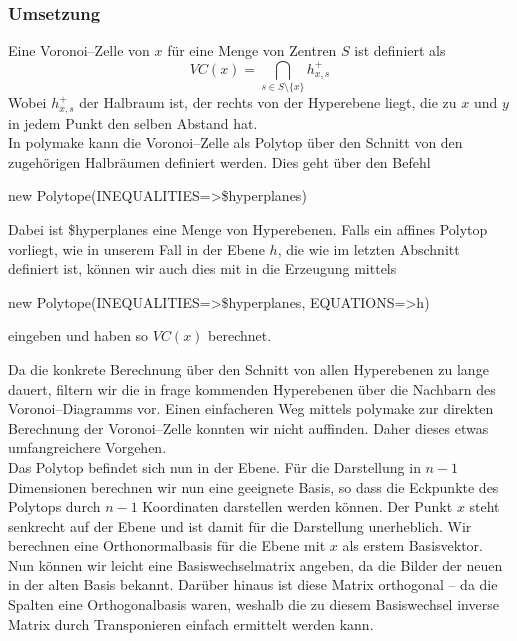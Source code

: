         \subsubsection*{Umsetzung}
         Eine Voronoi--Zelle von $x$ für eine Menge von Zentren $S$ ist definiert als 
         $$ VC(x) = \bigcap_{s \in S \setminus \{ x \}} h^+_{x,s}$$
         Wobei $h^+_{x,s}$ der Halbraum ist, der rechts von der Hyperebene liegt, die zu $x$ und $y$ in jedem Punkt den selben Abstand hat.\\
         
         In polymake kann die Voronoi--Zelle als Polytop über den Schnitt von den zugehörigen Halbräumen definiert werden. Dies geht über den Befehl

         \begin{code}
            new Polytope(INEQUALITIES=>\$hyperplanes)
         \end{code}

         Dabei ist \$hyperplanes eine Menge von Hyperebenen. Falls ein affines Polytop vorliegt, wie in unserem Fall in der Ebene $h$, die wie im letzten Abschnitt
         definiert ist, können wir auch dies mit in die Erzeugung mittels

         \begin{code}
            new Polytope(INEQUALITIES=>\$hyperplanes, EQUATIONS=>{h})
         \end{code}

         eingeben und haben so $VC(x)$ berechnet. 
         
         Da die konkrete Berechnung über den Schnitt von allen Hyperebenen zu lange dauert, filtern wir die in frage kommenden Hyperebenen über die Nachbarn des Voronoi--Diagramms vor.
         Einen einfacheren Weg mittels polymake zur direkten Berechnung der Voronoi--Zelle konnten wir nicht auffinden. Daher dieses etwas umfangreichere Vorgehen.\\

         Das Polytop befindet sich nun in der Ebene. Für die Darstellung in $n-1$ Dimensionen berechnen wir nun eine geeignete Basis, so dass die Eckpunkte des Polytops durch $n-1$ Koordinaten darstellen werden können. 
         Der Punkt $x$ steht senkrecht auf der Ebene und ist damit für die Darstellung 
         unerheblich. Wir berechnen eine Orthonormalbasis für die Ebene mit $x$ als erstem Basisvektor. Nun können wir leicht eine Basiswechselmatrix angeben,
         da die Bilder der neuen in der alten Basis bekannt. Darüber hinaus ist diese Matrix orthogonal -- da die Spalten eine Orthogonalbasis waren, weshalb die zu diesem Basiswechsel inverse Matrix durch Transponieren einfach ermittelt werden kann.

